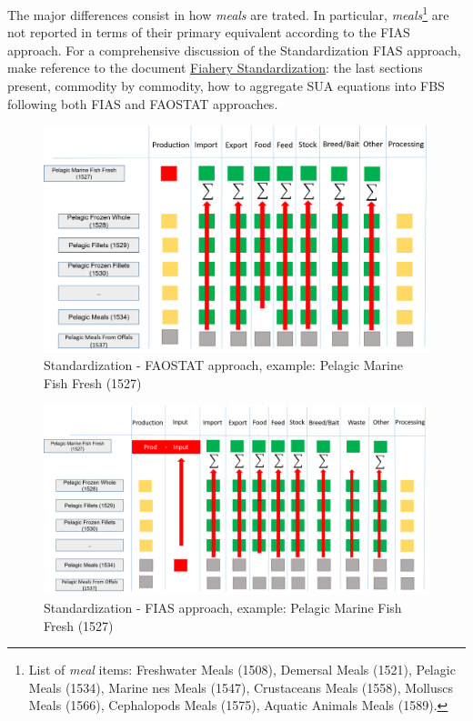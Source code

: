 \documentclass[nojss]{jss}
\begin{document}
The major differences consist in how \textit{meals} are trated. In particular, \textit{meals}\footnote{List of \textit{meal} items: Freshwater Meals (1508), Demersal Meals (1521), Pelagic Meals (1534), Marine nes Meals (1547), Crustaceans Meals (1558), Molluscs Meals (1566), Cephalopods Meals (1575), Aquatic Animals Meals (1589).} are not reported in terms of their primary equivalent according to the FIAS approach. For a comprehensive discussion of the Standardization FIAS approach, make reference to the document \href{https://unfao.sharepoint.com/:f:/s/pwa/SWS%20Phase%20III/EibKX3qrwsNAhKrHrkvTJgsBEu8Lb7NKyo5y52xl2CUXtg?e=0LuuC6}{Fiahery Standardization}: the last sections present, commodity by commodity, how to aggregate SUA equations into FBS following both FIAS and FAOSTAT approaches.

\begin{center}
\begin{figure}
\includegraphics{flow-charts/standardization/FAOSTAT_standardization.png}
\caption{Standardization - FAOSTAT approach, example: Pelagic Marine Fish Fresh  (1527)}
\end{figure}
\end{center}


\begin{center}
\begin{figure}
\includegraphics{flow-charts/standardization/FIAS_standardization.png}
\caption{Standardization - FIAS approach, example: Pelagic Marine Fish Fresh  (1527)}
\end{figure}
\end{center}
\end{document}

